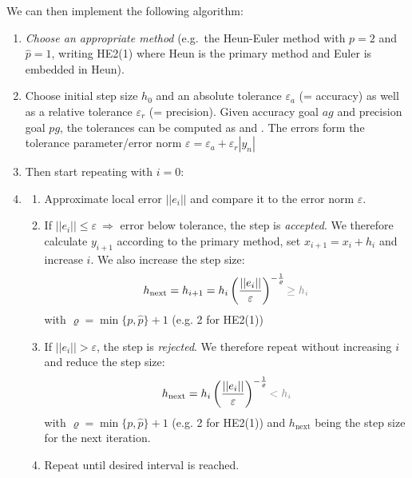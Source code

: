 We can then implement the following algorithm:
\begin{enumerate}
    \item{
        \emph{Choose an appropriate method}
        (e.g.\ the Heun-Euler method with $p=2$ and $\hat{p}=1$, writing HE2(1)
        where Heun is the primary method and Euler is embedded in Heun).
    }
    \item{
        Choose initial step size $h_0$ and an absolute tolerance $\varepsilon_{a}$ (= accuracy) as
        well as a relative tolerance $\varepsilon_{r}$ (= precision).
        Given accuracy goal $ag$ and precision goal $pg$,
        the tolerances can be computed as 
        and .
        The errors form the tolerance parameter/error norm
        \colorbox{shadecolor}{
            $\displaystyle\varepsilon = \varepsilon_a + \varepsilon_r |y_n|$
        }
    }
    \item Then start repeating with $i=0$:
    \item{
        \begin{enumerate}
            \item{
                Approximate local error $||e_i||$ and compare it to the error norm $\varepsilon$.
            }
            \item{
                If $||e_i||\leq\varepsilon\ \Rightarrow$ error below tolerance,
                the step is \emph{\color{darkgreen}accepted}.
                We therefore calculate $y_{i+1}$ according to the primary method,
                set $x_{i+1} = x_i + h_i$ and increase $i$.
                We also increase the step size:
                \begin{align*}
                    h_\text{next} = h_{i+1} = h_i\left(\frac{||e_i||}{\varepsilon}\right)^{-\frac{1}{\varrho}}
                    {\color{gray} \geq h_i}
                \end{align*}
                with $\varrho = \min\{p, \hat{p}\} + 1$ (e.g. 2 for HE2(1))
            }
            \item{
                If $||e_i||>\varepsilon$, the step is \emph{\color{red}rejected}.
                We therefore repeat without increasing $i$ and reduce the step size:
                \begin{align*}
                    h_\text{next} = h_i\left(\frac{||e_i||}{\varepsilon}\right)^{-\frac{1}{\varrho}}
                    {\color{gray} < h_i}
                \end{align*}
                with $\varrho = \min\{p, \hat{p}\} + 1$ (e.g. 2 for HE2(1))
                and $h_\text{next}$ being the step size for the next iteration.
            }
            \item Repeat until desired interval is reached.
        \end{enumerate}
    }
\end{enumerate}

